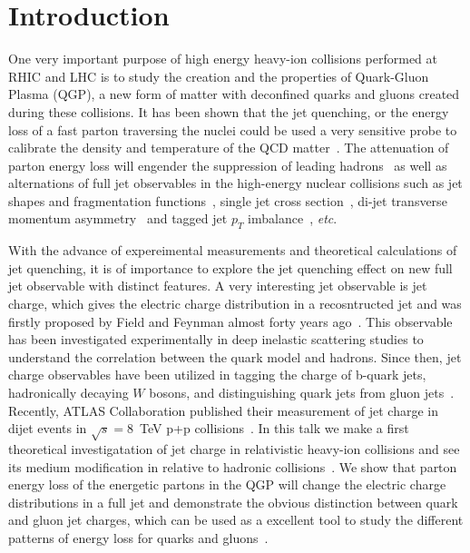 \documentclass[3p,times,twocolumn]{elsarticle}
\begin{document}
\section{Introduction}
\label{Introduction}




One very important purpose of high energy heavy-ion collisions performed at RHIC
and LHC is to study the creation and  the properties of Quark-Gluon Plasma (QGP),
a new form of matter with deconfined quarks and gluons created during these collisions.  It has been shown that the jet quenching, or the energy loss of a fast parton traversing the nuclei could be used a very sensitive probe to calibrate the density and temperature  of the QCD matter~\cite{Gyulassy:2003mc}. The attenuation of parton energy loss will engender the suppression of leading hadrons~\cite{Gyulassy:2003mc,Dai:2015dxa}  as well as alternations of full jet observables in the high-energy nuclear collisions  such as jet shapes and fragmentation functions~\cite{Vitev:2008rz,Qin:2015srf}, single jet cross section~\cite{Vitev:2009rd}, di-jet transverse momentum asymmetry~\cite{He:2011pd} and tagged jet $p_{T}$ imbalance~\cite{Dai:2012am}, {\it etc}.

With the advance of expereimental measurements and theoretical calculations of jet quenching, it is of importance to explore the jet quenching effect on new full jet observable with distinct features.
A very interesting jet observable is jet charge, which gives the electric charge distribution in a recosntructed jet and was firstly proposed by Field and Feynman almost forty years ago~\cite{Field:1977fa}. This observable has been investigated experimentally in deep inelastic scattering studies to understand
the correlation between the quark model and hadrons. Since then, jet charge observables have
been utilized in tagging the charge of b-quark jets, hadronically
decaying $W$ bosons,  and distinguishing quark jets from gluon jets~\cite{Krohn:2012fg,Waalewijn:2012sv}.
Recently, ATLAS Collaboration published their measurement of jet charge in dijet events in
$\sqrt{s}=8$~TeV p+p collisions~\cite{Aad:2015cua}. In this talk we make a first theoretical investigatation of jet charge in relativistic heavy-ion collisions and see its medium modification in relative to hadronic collisions~\cite{Chen:2016}. We show that parton energy loss of the energetic partons in the QGP will change the electric charge distributions in a full jet and demonstrate the obvious distinction between quark and gluon jet charges, which can be used as a excellent tool to study the different patterns of energy loss for quarks and gluons~\cite{Liu:2006sf, Chen:2008vha}.
\end{document}
